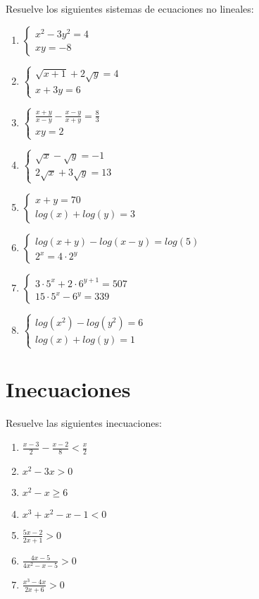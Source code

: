 \Exercicio Resuelve los siguientes sistemas de ecuaciones no lineales:

\begin{enumerate}[topsep=0pt]
	\item $ \begin{cases}
		x^2 - 3y^2 = 4 \\
		xy = -8
	\end{cases}  $
	\item $ \begin{cases}
		\sqrt{x+1} + 2\sqrt{y} = 4 \\
		x+3y=6
	\end{cases}  $
	\item $ \begin{cases}
		\frac{x+y}{x-y} -\frac{x-y}{x+y} = \frac{8}{3} \\
		xy = 2
	\end{cases}  $
	\item $ \begin{cases}
		\sqrt{x} - \sqrt{y} = -1 \\
		2\sqrt{x} + 3\sqrt{y} = 13
	\end{cases}  $
	\item $ \begin{cases}
		x+y = 70 \\
		log(x) + log(y) = 3
	\end{cases}  $
	\item $ \begin{cases}
		log(x+y) - log(x-y) = log(5) \\
		2^x = 4 \cdot 2^y
	\end{cases}  $
	\item $ \begin{cases}
		3 \cdot 5^x + 2 \cdot 6^{y+1} = 507\\
		15 \cdot 5^x - 6 ^y = 339
	\end{cases}  $
	\item $ \begin{cases}
		log(x^2) - log(y^2) = 6 \\
		log(x) + log(y) = 1
	\end{cases}  $
\end{enumerate}

\section{Inecuaciones}

\Exercicio Resuelve las siguientes inecuaciones:

\begin{enumerate}[topsep=0pt]
	\item $ \frac{x-3}{2} - \frac{x-2}{8} < \frac{x}{2} $
	\item $ x^2-3x > 0 $
	\item $ x^2 - x \ge 6 $
	\item $ x^3 +x^2 - x -1 < 0 $
	\item $ \frac{5x-2}{2x+1} > 0 $
	\item $ \frac{4x-5}{4x^2-x-5} > 0 $
	\item $ \frac{x^3-4x}{2x+6} > 0 $
\end{enumerate}


